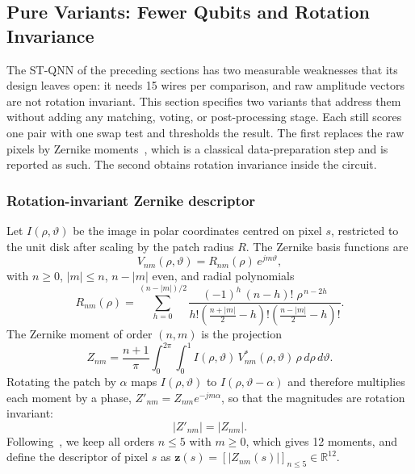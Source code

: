 \documentclass[conference]{IEEEtran}
\begin{document}
\subsection{Pure Variants: Fewer Qubits and Rotation Invariance}\label{sec:zernike}
The ST-QNN of the preceding sections has two measurable weaknesses that its design leaves open: it needs 15 wires per comparison, and raw amplitude vectors are not rotation invariant. This section specifies two variants that address them without adding any matching, voting, or post-processing stage. Each still scores one pair with one swap test and thresholds the result. The first replaces the raw pixels by Zernike moments~\cite{cozzolino2015,teague1980}, which is a classical data-preparation step and is reported as such. The second obtains rotation invariance inside the circuit.

\subsubsection{Rotation-invariant Zernike descriptor}
Let $I(\rho,\vartheta)$ be the image in polar coordinates centred on pixel $s$, restricted to the unit disk after scaling by the patch radius $R$. The Zernike basis functions are
\begin{equation}
V_{nm}(\rho,\vartheta) = R_{nm}(\rho)\,e^{jm\vartheta},
\label{eq:zbasis}
\end{equation}
with $n\ge 0$, $|m|\le n$, $n-|m|$ even, and radial polynomials
\begin{equation}
R_{nm}(\rho) = \sum_{h=0}^{(n-|m|)/2} \frac{(-1)^h\,(n-h)!\;\rho^{\,n-2h}}{h!\left(\frac{n+|m|}{2}-h\right)!\left(\frac{n-|m|}{2}-h\right)!}.
\label{eq:zradial}
\end{equation}
The Zernike moment of order $(n,m)$ is the projection~\cite{teague1980}
\begin{equation}
Z_{nm} = \frac{n+1}{\pi}\int_0^{2\pi}\!\!\int_0^1 I(\rho,\vartheta)\,V_{nm}^*(\rho,\vartheta)\,\rho\,d\rho\,d\vartheta .
\label{eq:zmoment}
\end{equation}
Rotating the patch by $\alpha$ maps $I(\rho,\vartheta)$ to $I(\rho,\vartheta-\alpha)$ and therefore multiplies each moment by a phase, $Z'_{nm} = Z_{nm}e^{-jm\alpha}$, so that the magnitudes are rotation invariant:
\begin{equation}
|Z'_{nm}| = |Z_{nm}|.
\label{eq:zinv}
\end{equation}
Following~\cite{cozzolino2015}, we keep all orders $n\le 5$ with $m\ge 0$, which gives 12 moments, and define the descriptor of pixel $s$ as $\mathbf{z}(s) = \left[|Z_{nm}(s)|\right]_{n\le5}\in\mathbb{R}^{12}$.
\end{document}
